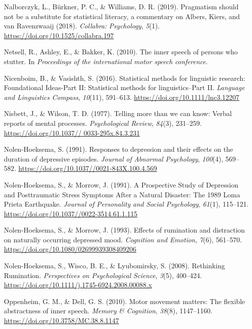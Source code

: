 \documentclass[a4paper,12pt,twoside,openright,oldfontcommands]{memoir}
\begin{document}
\hypertarget{ref-nalborczyk_pragmatism_2019}{}
Nalborczyk, L., Bürkner, P. C., \& Williams, D. R. (2019). Pragmatism
should not be a substitute for statistical literacy, a commentary on
Albers, Kiers, and van Ravenzwaaij (2018). \emph{Collabra: Psychology},
\emph{5}(1). \url{https://doi.org/10.1525/collabra.197}

\hypertarget{ref-netsell_inner_2010}{}
Netsell, R., Ashley, E., \& Bakker, K. (2010). The inner speech of
persons who stutter. In \emph{Proceedings of the international motor
speech conference}.

\hypertarget{ref-nicenboim_statistical_2016}{}
Nicenboim, B., \& Vasishth, S. (2016). Statistical methods for
linguistic research: Foundational Ideas-Part II: Statistical methods for
linguistics--Part II. \emph{Language and Linguistics Compass},
\emph{10}(11), 591--613. \url{https://doi.org/10.1111/lnc3.12207}

\hypertarget{ref-nisbett_telling_1977}{}
Nisbett, J., \& Wilson, T. D. (1977). Telling more than we can know:
Verbal reports of mental processes. \emph{Psychological Review},
\emph{84}(3), 231--259.
\href{https://doi.org/10.1037//\%200033-295x.84.3.231}{https://doi.org/10.1037// 0033-295x.84.3.231}

\hypertarget{ref-nolen-hoeksema_responses_1991}{}
Nolen-Hoeksema, S. (1991). Responses to depression and their effects on
the duration of depressive episodes. \emph{Journal of Abnormal
Psychology}, \emph{100}(4), 569--582.
\url{https://doi.org/10.1037//0021-843X.100.4.569}

\hypertarget{ref-nolen-hoeksema_prospective_1991}{}
Nolen-Hoeksema, S., \& Morrow, J. (1991). A Prospective Study of
Depression and Posttraumatic Stress Symptoms After a Natural Disaster:
The 1989 Loma Prieta Earthquake. \emph{Journal of Personality and Social
Psychology}, \emph{61}(1), 115--121.
\url{https://doi.org/10.1037//0022-3514.61.1.115}

\hypertarget{ref-nolen-hoeksema_effects_1993}{}
Nolen-Hoeksema, S., \& Morrow, J. (1993). Effects of rumination and
distraction on naturally occurring depressed mood. \emph{Cognition and
Emotion}, \emph{7}(6), 561--570.
\url{https://doi.org/10.1080/02699939308409206}

\hypertarget{ref-Nolen-Hoeksema2008}{}
Nolen-Hoeksema, S., Wisco, B. E., \& Lyubomirsky, S. (2008). Rethinking
Rumination. \emph{Perspectives on Psychological Science}, \emph{3}(5),
400--424. \url{https://doi.org/10.1111/j.1745-6924.2008.00088.x}

\hypertarget{ref-oppenheim_motor_2010}{}
Oppenheim, G. M., \& Dell, G. S. (2010). Motor movement matters: The
flexible abstractness of inner speech. \emph{Memory \& Cognition},
\emph{38}(8), 1147--1160. \url{https://doi.org/10.3758/MC.38.8.1147}
\end{document}
